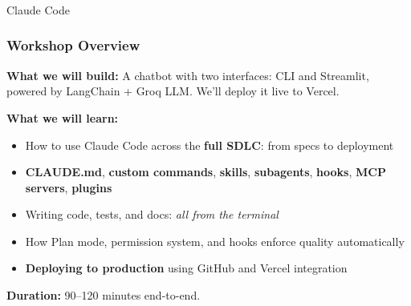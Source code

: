 \begin{frame}[fragile]\frametitle{}

\begin{center}
{\Large Claude Code}
\end{center}
\end{frame}

\begin{frame}[fragile]\frametitle{Workshop Overview}
\textbf{What we will build:} A chatbot with two interfaces: CLI and Streamlit, powered by LangChain + Groq LLM. We'll deploy it live to Vercel.

\textbf{What we will learn:}
  \begin{itemize}
    \item How to use Claude Code across the \textbf{full SDLC}: from specs to deployment
    \item \textbf{CLAUDE.md}, \textbf{custom commands}, \textbf{skills}, \textbf{subagents}, \textbf{hooks}, \textbf{MCP servers}, \textbf{plugins}
    \item Writing code, tests, and docs: \textit{all from the terminal}
    \item How Plan mode, permission system, and hooks enforce quality automatically
    \item \textbf{Deploying to production} using GitHub and Vercel integration
  \end{itemize}

\textbf{Duration:} 90--120 minutes end-to-end.
\end{frame}


